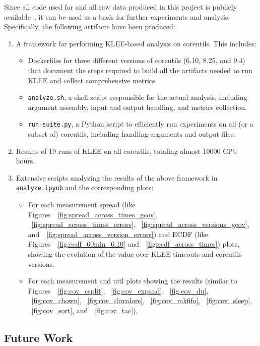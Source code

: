 \documentclass{article}
\let\savedCite=\cite
\renewcommand{\cite}{\unskip~\savedCite}
\let\savedRef=\ref
\renewcommand{\ref}{\unskip~\savedRef}
\begin{document}
Since all code used for and all raw data produced in this project is publicly available\cite{GitHub}, it can be used as a basis for further experiments and analysis. Specifically, the following artifacts have been produced:
\begin{enumerate}
    \item A framework for performing KLEE-based analysis on coreutils. This includes:
          \begin{itemize}
              \item Dockerfiles for three different versions of coreutils (6.10, 8.25, and 9.4) that document the steps required to build all the artifacts needed to run KLEE and collect comprehensive metrics.
              \item \lstinline{analyze.sh}, a shell script responsible for the actual analysis, including argument assembly, input and output handling, and metrics collection.
              \item \lstinline{run-suite.py}, a Python script to efficiently run experiments on all (or a subset of) coreutils, including handling arguments and output files.
          \end{itemize}
    \item Results of 19 runs of KLEE on all coreutils, totaling almost 10000 CPU hours.
    \item Extensive scripts analyzing the results of the above framework in \lstinline{analyze.ipynb} and the corresponding plots:
          \begin{itemize}
              \item For each measurement spread (like Figures~\ref{fig:spread_across_times_gcov}, \ref{fig:spread_across_times_errors}, \ref{fig:spread_across_versions_gcov}, and~\ref{fig:spread_across_version_errors}) and ECDF (like Figures~\ref{fig:ecdf_60min_6.10} and~\ref{fig:ecdf_across_times}) plots, showing the evolution of the value over KLEE timeouts and coreutils versions.
              \item For each measurement and util plots showing the results (similar to Figures~\ref{fig:cov_csplit}, \ref{fig:cov_expand}, \ref{fig:cov_du}, \ref{fig:cov_chown}, \ref{fig:cov_dircolors}, \ref{fig:cov_mkfifo}, \ref{fig:cov_sleep}, \ref{fig:cov_sort}, and~\ref{fig:cov_tac}).
          \end{itemize}
\end{enumerate}

\subsection{Future Work}
\end{document}
